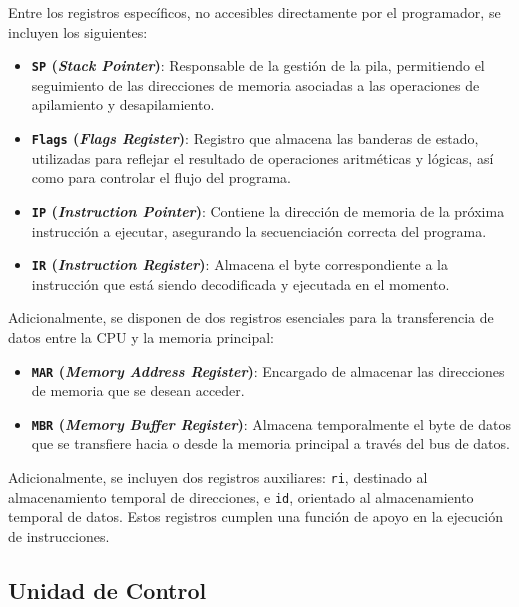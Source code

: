 \documentclass[12pt,oneside]{templates/unerthesis}
\providecommand{\tightlist}{%
  \setlength{\itemsep}{0pt}\setlength{\parskip}{0pt}}
\begin{document}
Entre los registros específicos, no accesibles directamente por el programador, se incluyen los siguientes:

\begin{itemize}
\tightlist
\item
  \textbf{\texttt{SP} (\emph{Stack Pointer})}: Responsable de la gestión de la pila, permitiendo el seguimiento de las direcciones de memoria asociadas a las operaciones de apilamiento y desapilamiento.\\
\item
  \textbf{\texttt{Flags} (\emph{Flags Register})}: Registro que almacena las banderas de estado, utilizadas para reflejar el resultado de operaciones aritméticas y lógicas, así como para controlar el flujo del programa.\\
\item
  \textbf{\texttt{IP} (\emph{Instruction Pointer})}: Contiene la dirección de memoria de la próxima instrucción a ejecutar, asegurando la secuenciación correcta del programa.\\
\item
  \textbf{\texttt{IR} (\emph{Instruction Register})}: Almacena el byte correspondiente a la instrucción que está siendo decodificada y ejecutada en el momento.
\end{itemize}

Adicionalmente, se disponen de dos registros esenciales para la transferencia de datos entre la CPU y la memoria principal:

\begin{itemize}
\tightlist
\item
  \textbf{\texttt{MAR} (\emph{Memory Address Register})}: Encargado de almacenar las direcciones de memoria que se desean acceder.\\
\item
  \textbf{\texttt{MBR} (\emph{Memory Buffer Register})}: Almacena temporalmente el byte de datos que se transfiere hacia o desde la memoria principal a través del bus de datos.
\end{itemize}

Adicionalmente, se incluyen dos registros auxiliares: \texttt{ri}, destinado al almacenamiento temporal de direcciones, e \texttt{id}, orientado al almacenamiento temporal de datos. Estos registros cumplen una función de apoyo en la ejecución de instrucciones.

\hypertarget{unidad-de-control}{%
\subsection{Unidad de Control}\label{unidad-de-control}}
\end{document}
